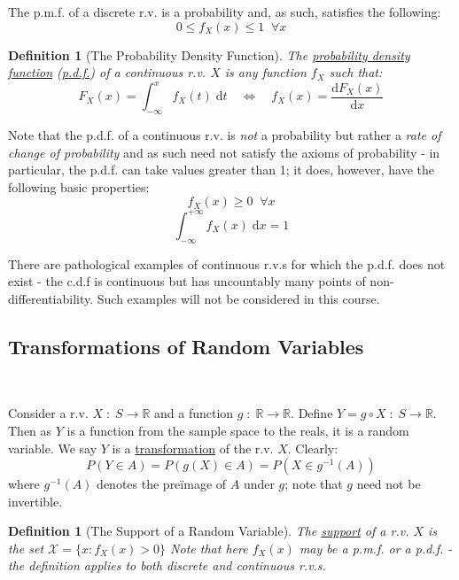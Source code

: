 \documentclass[12pt,a4paper]{article}
\newtheorem{defn}[thm]{Definition}
\begin{document}
\noindent The p.m.f. of a discrete r.v. is a probability and, as such, satisfies the following:
$$0 \leq f_X(x) \leq 1 \;\;\forall x$$

\begin{defn}[The Probability Density Function]
\vspace{1cm}

The \underline{probability density function} (\underline{p.d.f.}) of a continuous r.v. $X$ is any function $f_X$ such that:
$$F_X(x) = \int_{-\infty}^x\!\!f_X(t)\;\mathrm{d}t \quad \Leftrightarrow\quad f_X(x) = \frac{\mathrm{d}F_X(x)}{\mathrm{d}x}$$
\end{defn}

Note that the p.d.f. of a continuous r.v. is {\it not} a probability but rather a {\it rate of change of probability} and as such need not satisfy the axioms of probability - in particular, the p.d.f. can take values greater than 1; it does, however, have the following basic properties:
$$f_X(x) \geq 0 \;\;\forall x$$
$$\int_{- \infty}^{+ \infty}\!\!f_X(x)\;\mathrm{d}x = 1$$

There are pathological examples of continuous r.v.s for which the p.d.f. does not exist - the c.d.f is continuous but has uncountably many points of non-differentiability. Such examples will not be considered in this course.

\subsection{Transformations of Random Variables}$\;$

Consider a r.v. $X \; : \; S\rightarrow\mathbb{R}$ and a function $g\; : \; \mathbb{R}\rightarrow\mathbb{R}$. Define $Y = g \circ X \; : \; S\rightarrow\mathbb{R}$. Then as $Y$ is a function from the sample space to the reals, it is a random variable. We say $Y$ is a \underline{transformation} of the r.v. $X$. Clearly:
$$P(Y \in A) = P(g(X) \in A) = P(X \in g^{-1}(A))$$
\noindent where $g^{-1}(A)$ denotes the pre\"image of $A$ under $g$; note that $g$ need not be invertible.

\begin{defn}[The Support of a Random Variable]
\vspace{1cm}

The \underline{support} of a r.v. $X$ is the set $\mathcal{X} = \{x : f_X(x) > 0\}$ Note that here $f_X(x)$ may be a p.m.f. or a p.d.f. - the definition applies to both discrete and continuous r.v.s.
\end{defn}
\end{document}
